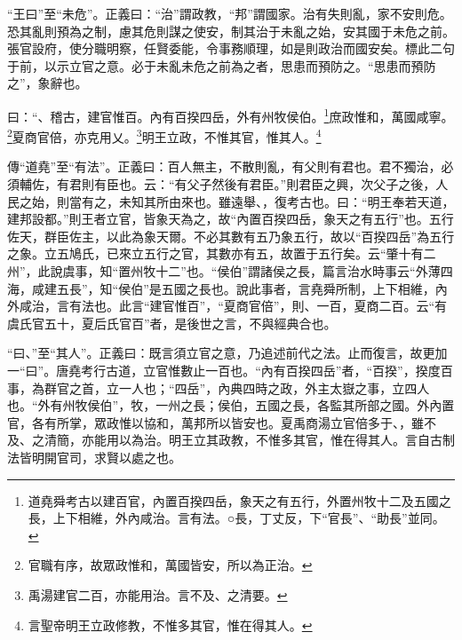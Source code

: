 {\noindent\shu{}\fzkt “王曰”至“未危”。正義曰：“治”謂政教，“邦”謂國家。治有失則亂，家不安則危。恐其亂則預為之制，慮其危則謀之使安，制其治于未亂之始，安其國于未危之前。張官設府，使分職明察，任賢委能，令事務順理，如是則政治而國安矣。標此二句于前，以示立官之意。必于未亂未危之前為之者，思患而預防之。“思患而預防之”，象辭也。 \par}

曰：“、稽古，建官惟百。內有百揆四岳，外有州牧侯伯。\footnote{道堯舜考古以建百官，內置百揆四岳，象天之有五行，外置州牧十二及五國之長，上下相維，外內咸治。言有法。○長，丁丈反，下“官長”、“助長”並同。}庶政惟和，萬國咸寧。\footnote{官職有序，故眾政惟和，萬國皆安，所以為正治。}夏商官倍，亦克用乂。\footnote{禹湯建官二百，亦能用治。言不及、之清要。}明王立政，不惟其官，惟其人。\footnote{言聖帝明王立政修教，不惟多其官，惟在得其人。}


{\noindent\zhuan{}\fzbyks 傳“道堯”至“有法”。正義曰：百人無主，不散則亂，有父則有君也。君不獨治，必須輔佐，有君則有臣也。云：“有父子然後有君臣。”則君臣之興，次父子之後，人民之始，則當有之，未知其所由來也。雖遠舉、，復考古也。曰：“明王奉若天道，建邦設都。”則王者立官，皆象天為之，故“內置百揆四岳，象天之有五行”也。五行佐天，群臣佐主，以此為象天爾。不必其數有五乃象五行，故以“百揆四岳”為五行之象。立五鳩氏，已來立五行之官，其數亦有五，故置于五行矣。云“肇十有二州”，此說虞事，知“置州牧十二”也。“侯伯”謂諸侯之長，篇言治水時事云“外薄四海，咸建五長”，知“侯伯”是五國之長也。說此事者，言堯舜所制，上下相維，內外咸治，言有法也。此言“建官惟百”，“夏商官倍”，則、一百，夏商二百。云“有虞氏官五十，夏后氏官百”者，是後世之言，不與經典合也。 \par}

{\noindent\shu{}\fzkt “曰、”至“其人”。正義曰：既言須立官之意，乃追述前代之法。止而復言，故更加一“曰”。唐堯考行古道，立官惟數止一百也。“內有百揆四岳”者，“百揆”，揆度百事，為群官之首，立一人也；“四岳”，內典四時之政，外主太嶽之事，立四人也。“外有州牧侯伯”，牧，一州之長；侯伯，五國之長，各監其所部之國。外內置官，各有所掌，眾政惟以協和，萬邦所以皆安也。夏禹商湯立官倍多于、，雖不及、之清簡，亦能用以為治。明王立其政教，不惟多其官，惟在得其人。言自古制法皆明開官司，求賢以處之也。 \par}


